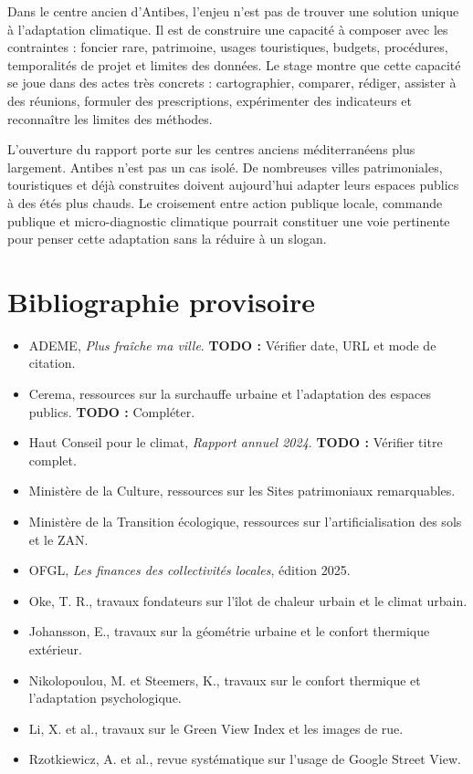 \documentclass[11pt,a4paper]{report}
\newcommand{\todo}[1]{\textcolor{todored}{\textbf{TODO :} #1}}
\begin{document}
Dans le centre ancien d'Antibes, l'enjeu n'est pas de trouver une solution unique à l'adaptation climatique. Il est de construire une capacité à composer avec les contraintes : foncier rare, patrimoine, usages touristiques, budgets, procédures, temporalités de projet et limites des données. Le stage montre que cette capacité se joue dans des actes très concrets : cartographier, comparer, rédiger, assister à des réunions, formuler des prescriptions, expérimenter des indicateurs et reconnaître les limites des méthodes.

L'ouverture du rapport porte sur les centres anciens méditerranéens plus largement. Antibes n'est pas un cas isolé. De nombreuses villes patrimoniales, touristiques et déjà construites doivent aujourd'hui adapter leurs espaces publics à des étés plus chauds. Le croisement entre action publique locale, commande publique et micro-diagnostic climatique pourrait constituer une voie pertinente pour penser cette adaptation sans la réduire à un slogan.

\chapter*{Bibliographie provisoire}

\begin{itemize}
  \item ADEME, \emph{Plus fraîche ma ville}. \todo{Vérifier date, URL et mode de citation.}
  \item Cerema, ressources sur la surchauffe urbaine et l'adaptation des espaces publics. \todo{Compléter.}
  \item Haut Conseil pour le climat, \emph{Rapport annuel 2024}. \todo{Vérifier titre complet.}
  \item Ministère de la Culture, ressources sur les Sites patrimoniaux remarquables.
  \item Ministère de la Transition écologique, ressources sur l'artificialisation des sols et le ZAN.
  \item OFGL, \emph{Les finances des collectivités locales}, édition 2025.
  \item Oke, T. R., travaux fondateurs sur l'îlot de chaleur urbain et le climat urbain.
  \item Johansson, E., travaux sur la géométrie urbaine et le confort thermique extérieur.
  \item Nikolopoulou, M. et Steemers, K., travaux sur le confort thermique et l'adaptation psychologique.
  \item Li, X. et al., travaux sur le Green View Index et les images de rue.
  \item Rzotkiewicz, A. et al., revue systématique sur l'usage de Google Street View.
\end{itemize}
\end{document}
